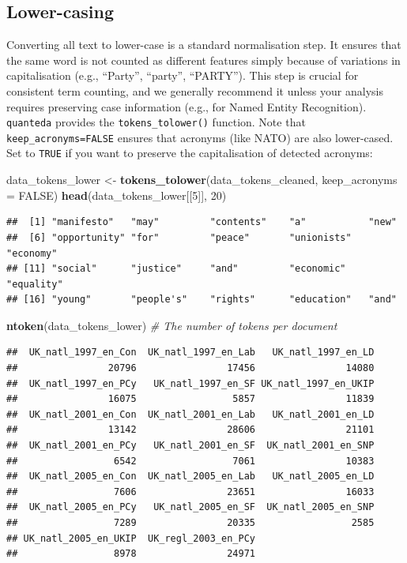 \documentclass[
]{book}
\newenvironment{Shaded}{\begin{snugshade}}{\end{snugshade}}
\newcommand{\AttributeTok}[1]{\textcolor[rgb]{0.13,0.29,0.53}{#1}}
\newcommand{\CommentTok}[1]{\textcolor[rgb]{0.56,0.35,0.01}{\textit{#1}}}
\newcommand{\ConstantTok}[1]{\textcolor[rgb]{0.56,0.35,0.01}{#1}}
\newcommand{\DecValTok}[1]{\textcolor[rgb]{0.00,0.00,0.81}{#1}}
\newcommand{\FunctionTok}[1]{\textcolor[rgb]{0.13,0.29,0.53}{\textbf{#1}}}
\newcommand{\NormalTok}[1]{#1}
\newcommand{\OtherTok}[1]{\textcolor[rgb]{0.56,0.35,0.01}{#1}}
\begin{document}
\subsection{Lower-casing}\label{lower-casing}

Converting all text to lower-case is a standard normalisation step. It ensures that the same word is not counted as different features simply because of variations in capitalisation (e.g., ``Party'', ``party'', ``PARTY''). This step is crucial for consistent term counting, and we generally recommend it unless your analysis requires preserving case information (e.g., for Named Entity Recognition). \texttt{quanteda} provides the \texttt{tokens\_tolower()} function. Note that \texttt{keep\_acronyms=FALSE} ensures that acronyms (like NATO) are also lower-cased. Set to \texttt{TRUE} if you want to preserve the capitalisation of detected acronyms:

\begin{Shaded}
\begin{Highlighting}[]
\NormalTok{data\_tokens\_lower }\OtherTok{\textless{}{-}} \FunctionTok{tokens\_tolower}\NormalTok{(data\_tokens\_cleaned, }\AttributeTok{keep\_acronyms =} \ConstantTok{FALSE}\NormalTok{)}
\FunctionTok{head}\NormalTok{(data\_tokens\_lower[[}\DecValTok{5}\NormalTok{]], }\DecValTok{20}\NormalTok{)}
\end{Highlighting}
\end{Shaded}

\begin{verbatim}
##  [1] "manifesto"   "may"         "contents"    "a"           "new"        
##  [6] "opportunity" "for"         "peace"       "unionists"   "economy"    
## [11] "social"      "justice"     "and"         "economic"    "equality"   
## [16] "young"       "people's"    "rights"      "education"   "and"
\end{verbatim}

\begin{Shaded}
\begin{Highlighting}[]
\FunctionTok{ntoken}\NormalTok{(data\_tokens\_lower)  }\CommentTok{\# The number of tokens per document}
\end{Highlighting}
\end{Shaded}

\begin{verbatim}
##  UK_natl_1997_en_Con  UK_natl_1997_en_Lab   UK_natl_1997_en_LD 
##                20796                17456                14080 
##  UK_natl_1997_en_PCy   UK_natl_1997_en_SF UK_natl_1997_en_UKIP 
##                16075                 5857                11839 
##  UK_natl_2001_en_Con  UK_natl_2001_en_Lab   UK_natl_2001_en_LD 
##                13142                28606                21101 
##  UK_natl_2001_en_PCy   UK_natl_2001_en_SF  UK_natl_2001_en_SNP 
##                 6542                 7061                10383 
##  UK_natl_2005_en_Con  UK_natl_2005_en_Lab   UK_natl_2005_en_LD 
##                 7606                23651                16033 
##  UK_natl_2005_en_PCy   UK_natl_2005_en_SF  UK_natl_2005_en_SNP 
##                 7289                20335                 2585 
## UK_natl_2005_en_UKIP  UK_regl_2003_en_PCy 
##                 8978                24971
\end{verbatim}
\end{document}
